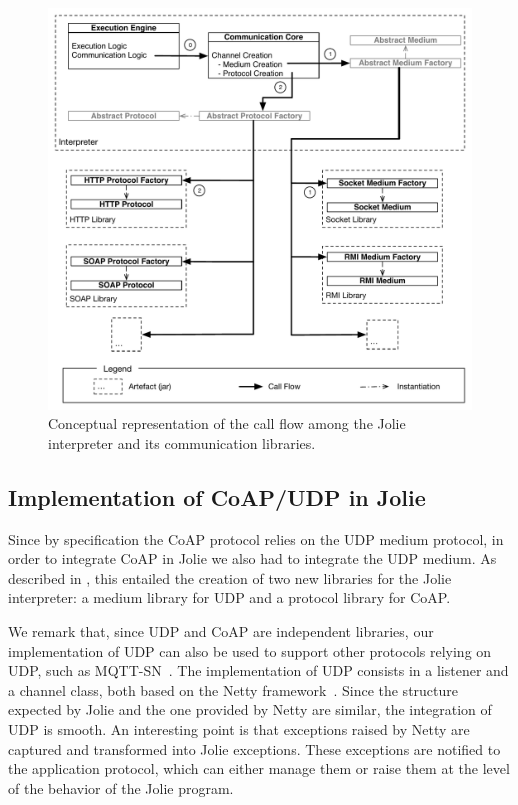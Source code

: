 \begin{figure}[t]
  \centering
  \includegraphics[width=\textwidth]{comm_modules.pdf}
  \caption{Conceptual representation of the call flow among the Jolie
  interpreter and its communication libraries.}
  \label{fig:comm_modules}
\end{figure}

\subsection{Implementation of CoAP/UDP in Jolie} %
\label{sec:impl_coap_udp}
%
Since by specification the CoAP protocol relies on the UDP medium protocol, in
order to integrate CoAP in Jolie we also had to integrate the UDP medium. As
described in , this entailed the creation of two
new libraries for the Jolie interpreter: a medium library for UDP and a
protocol library for CoAP.

We remark that, since UDP and CoAP are independent libraries, our
implementation of UDP can also be used to support other protocols relying on
UDP, such as MQTT-SN~\cite{hunkeler08}. The implementation of UDP consists in
a listener and a channel class, both based on the Netty
framework~\cite{maurer16}. Since the structure expected by Jolie and the one
provided by Netty are similar, the integration of UDP is smooth. An
interesting point is that exceptions raised by Netty are captured and
transformed into Jolie exceptions. These exceptions are notified to the
application protocol, which can either manage them or raise them at the level
of the behavior of the Jolie program.

